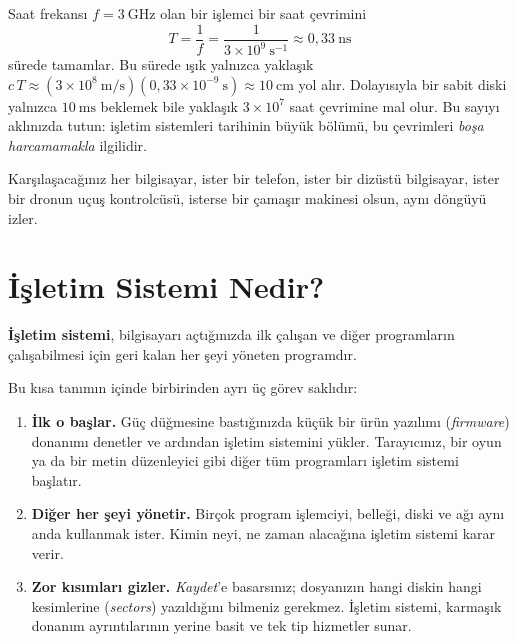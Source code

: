\documentclass[11pt,a4paper]{article}
\begin{document}
\begin{example}
Saat frekansı $f = 3\ \text{GHz}$ olan bir işlemci bir saat çevrimini
\[
T = \frac{1}{f} = \frac{1}{3\times 10^{9}\ \text{s}^{-1}} \approx 0{,}33\ \text{ns}
\]
sürede tamamlar. Bu sürede ışık yalnızca yaklaşık $c\,T \approx (3\times10^{8}\ \text{m/s})(0{,}33\times10^{-9}\ \text{s}) \approx 10\ \text{cm}$ yol alır. Dolayısıyla bir sabit diski yalnızca $10\ \text{ms}$ beklemek bile yaklaşık $3\times10^{7}$ saat çevrimine mal olur. Bu sayıyı aklınızda tutun: işletim sistemleri tarihinin büyük bölümü, bu çevrimleri \emph{boşa harcamamakla} ilgilidir.
\end{example}

Karşılaşacağınız her bilgisayar, ister bir telefon, ister bir dizüstü bilgisayar, ister bir dronun uçuş kontrolcüsü, isterse bir çamaşır makinesi olsun, aynı döngüyü izler.

\section{İşletim Sistemi Nedir?}

\begin{keyidea}
\textbf{İşletim sistemi}, bilgisayarı açtığınızda ilk çalışan ve diğer programların çalışabilmesi için geri kalan her şeyi yöneten programdır.
\end{keyidea}

Bu kısa tanımın içinde birbirinden ayrı üç görev saklıdır:

\begin{enumerate}[leftmargin=1.4em]
  \item \textbf{İlk o başlar.} Güç düğmesine bastığınızda küçük bir ürün yazılımı (\emph{firmware}) donanımı denetler ve ardından işletim sistemini yükler. Tarayıcınız, bir oyun ya da bir metin düzenleyici gibi diğer tüm programları işletim sistemi başlatır.
  \item \textbf{Diğer her şeyi yönetir.} Birçok program işlemciyi, belleği, diski ve ağı aynı anda kullanmak ister. Kimin neyi, ne zaman alacağına işletim sistemi karar verir.
  \item \textbf{Zor kısımları gizler.} \emph{Kaydet}'e basarsınız; dosyanızın hangi diskin hangi kesimlerine (\emph{sectors}) yazıldığını bilmeniz gerekmez. İşletim sistemi, karmaşık donanım ayrıntılarının yerine basit ve tek tip hizmetler sunar.
\end{enumerate}
\end{document}
